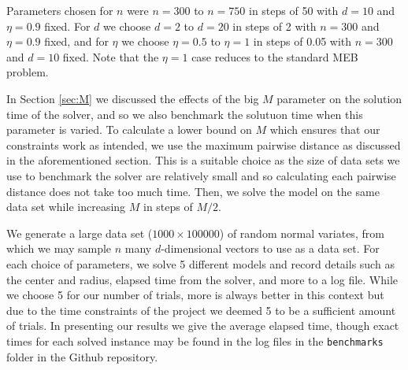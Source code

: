 \documentclass[11pt,twoside]{report}
\theoremstyle{definition}
\numberwithin{theorem}{section}
\numberwithin{definition}{section}
\numberwithin{lemma}{section}
\numberwithin{proposition}{section}
\numberwithin{equation}{section}
\numberwithin{figure}{section}
\begin{document}
Parameters chosen for $n$ were $n=300$ to $n=750$ in steps of 50 with $d=10$ and $\eta=0.9$ fixed. For $d$ we choose $d=2$ to $d=20$ in steps of 2 with $n=300$ and $\eta=0.9$ fixed, and for $\eta$ we choose $\eta=0.5$ to $\eta=1$ in steps of 0.05 with $n=300$ and $d=10$ fixed. Note that the $\eta=1$ case reduces to the standard MEB problem.

In Section \ref{sec:M} we discussed the effects of the big $M$ parameter on the solution time of the solver, and so we also benchmark the solutuon time when this parameter is varied. To calculate a lower bound on $M$ which ensures that our constraints work as intended, we use the maximum pairwise distance as discussed in the aforementioned section. This is a suitable choice as the size of data sets we use to benchmark the solver are relatively small and so calculating each pairwise distance does not take too much time. Then, we solve the model on the same data set while increasing $M$ in steps of $M/2$.

We generate a large data set ($1000\times100000$) of random normal variates, from which we may sample $n$ many $d$-dimensional vectors to use as a data set. For each choice of parameters, we solve 5 different models and record details such as the center and radius, elapsed time from the solver, and more to a log file. While we choose 5 for our number of trials, more is always better in this context but due to the time constraints of the project we deemed 5 to be a sufficient amount of trials. In presenting our results we give the average elapsed time, though exact times for each solved instance may be found in the log files in the \texttt{benchmarks} folder in the Github repository.
\end{document}

